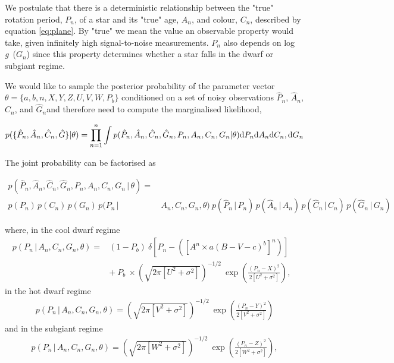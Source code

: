 \documentclass[10pt,preprint]{aastex}
\newcommand{\logg}{log \emph{g}~}
\newcommand{\ah}{$\hat{A}_n$}
\newcommand{\ph}{$\hat{P}_n$}
\newcommand{\ch}{$\hat{C}_n$}
\newcommand{\gh}{$\hat{G}_n$}
\begin{document}
We postulate that there is a deterministic relationship between the "true" rotation period, $P_n$, of a star and its "true" age, $A_n$, and colour, $C_n$, described by equation \ref{eq:plane}.
By "true" we mean the value an observable property would take, given infinitely high signal-to-noise measurements.
$P_n$ also depends on \logg($G_n$) since this property determines whether a star falls in the dwarf or subgiant regime.

We would like to sample the posterior probability of the parameter vector $\theta = \{a, b, n, X, Y, Z, U, V, W, P_b\}$ conditioned on a set of noisy observations \ph, \ah, \ch, and \gh and therefore need to compute the marginalised likelihood,

\begin{equation}
	p(\{\hat{P}_n,\hat{A}_n,\hat{C}_n,\hat{G}\}|\theta) =
	\prod_{n=1}^{n} \int p(\hat{P}_n,\hat{A}_n,\hat{C}_n,\hat{G}_n,P_n,A_n,C_n,G_n|\theta)
	{\rm d}P_n {\rm d}A_n {\rm d}C_n,{\rm d}G_n
\label{eq:fulll}
\end{equation}

The joint probability can be factorised as

\begin{align}
	p(\hat{P}_n,\hat{A}_n,\hat{C}_n,\hat{G}_n,P_n,A_n,C_n,G_n\,|\,\theta) = & \nonumber \\
	p(P_n)\,p(C_n)\,p(G_n)\,p(P_n\,| & \,A_n,C_n,G_n,\theta)\
        p(\hat{P}_n\,|\,P_n)\,p(\hat{A}_n\,|\,A_n)\,p(\hat{C}_n\,|\,C_n)\,p(\hat{G}_n\,|\,G_n)
\nonumber
\end{align}

where, in the cool dwarf regime
\begin{eqnarray}
p(P_n\,|\,A_n,C_n,G_n,\theta) =
	& (1-P_b)~\delta \left [P_n - \left(\left[A^n \times a(B-V - c)^b\right]^n\right) \right] \quad \\
	& +~P_b~\times \left(\sqrt{2\pi[U^2+\sigma^2]}\right)^{-1/2}~\exp\left({\frac{(P_n-X)^2}{2[U^2+\sigma^2]}}\right),
\end{eqnarray}
in the hot dwarf regime
\begin{eqnarray}
p(P_n\,|\,A_n,C_n,G_n,\theta) = \left(\sqrt{2\pi[V^2+\sigma^2]}\right)^{-1/2}~\exp\left({\frac{(P_n-Y)^2}{2[V^2+\sigma^2]}}\right)
\end{eqnarray}
and in the subgiant regime
\begin{eqnarray}
p(P_n\,|\,A_n,C_n,G_n,\theta) = \left(\sqrt{2\pi[W^2+\sigma^2]}\right)^{-1/2}~\exp\left({\frac{(P_n-Z)^2}{2[W^2+\sigma^2]}}\right),
\end{eqnarray}
\end{document}
